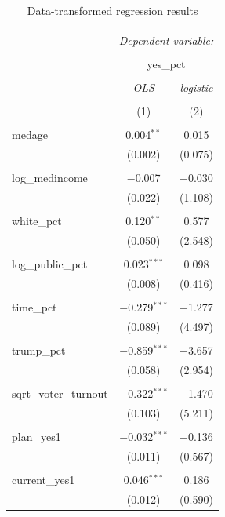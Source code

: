 \documentclass[
]{article}
\begin{document}
\begin{table}[!htbp] \centering 
  \caption{Data-transformed regression results} 
  \label{transformedResults} 
\begin{tabular}{@{\extracolsep{5pt}}lcc} 
\\[-1.8ex]\hline 
\hline \\[-1.8ex] 
 & \multicolumn{2}{c}{\textit{Dependent variable:}} \\ 
\cline{2-3} 
\\[-1.8ex] & \multicolumn{2}{c}{yes\_pct} \\ 
\\[-1.8ex] & \textit{OLS} & \textit{logistic} \\ 
\\[-1.8ex] & (1) & (2)\\ 
\hline \\[-1.8ex] 
 medage & 0.004$^{**}$ & 0.015 \\ 
  & (0.002) & (0.075) \\ 
  & & \\ 
 log\_medincome & $-$0.007 & $-$0.030 \\ 
  & (0.022) & (1.108) \\ 
  & & \\ 
 white\_pct & 0.120$^{**}$ & 0.577 \\ 
  & (0.050) & (2.548) \\ 
  & & \\ 
 log\_public\_pct & 0.023$^{***}$ & 0.098 \\ 
  & (0.008) & (0.416) \\ 
  & & \\ 
 time\_pct & $-$0.279$^{***}$ & $-$1.277 \\ 
  & (0.089) & (4.497) \\ 
  & & \\ 
 trump\_pct & $-$0.859$^{***}$ & $-$3.657 \\ 
  & (0.058) & (2.954) \\ 
  & & \\ 
 sqrt\_voter\_turnout & $-$0.322$^{***}$ & $-$1.470 \\ 
  & (0.103) & (5.211) \\ 
  & & \\ 
 plan\_yes1 & $-$0.032$^{***}$ & $-$0.136 \\ 
  & (0.011) & (0.567) \\ 
  & & \\ 
 current\_yes1 & 0.046$^{***}$ & 0.186 \\ 
  & (0.012) & (0.590) \\ 

\end{tabular}
\end{table}
\end{document}
